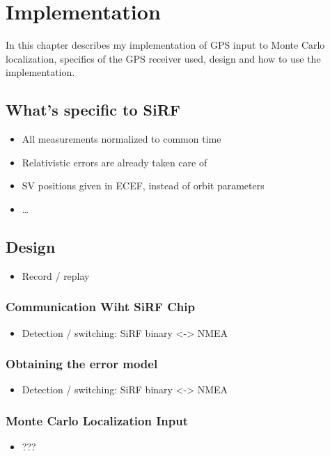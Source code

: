 \chapter{Implementation}
\label{chap:implementation}

In this chapter describes my implementation of GPS input to Monte Carlo localization,
specifics of the GPS receiver used, design and how to use the implementation.

\section{What's specific to SiRF}
\begin{itemize}
\item All measurements normalized to common time
\item Relativistic errors are already taken care of
\item SV positions given in ECEF, instead of orbit parameters
\item \ldots
\end{itemize}

\section{Design}
\begin{itemize}
\item Record / replay
\end{itemize}

\subsection{Communication Wiht SiRF Chip}
\begin{itemize}
\item Detection / switching: SiRF binary <-> NMEA
\end{itemize}

\subsection{Obtaining the error model}
\begin{itemize}
\item Detection / switching: SiRF binary <-> NMEA
\end{itemize}

\subsection{Monte Carlo Localization Input}
\begin{itemize}
\item ???
\end{itemize}

